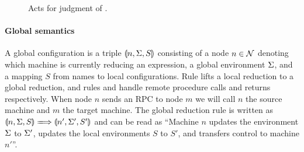 \begin{figure}
    \caption{Acts for judgment of \lang.}
    \label{fig:act-for-judgment}
\end{figure}


\paragraph{Global semantics}
A global configuration is a triple $\llparenthesis n, \Sigma, S \rrparenthesis$ consisting of a node $n \in \mathcal{N}$ denoting which machine is currently reducing an expression, a global environment $\Sigma$, and a mapping $S$ from names to local configurations. Rule  lifts a local reduction to a global reduction, and rules  and  handle remote procedure calls and returns respectively. When node $n$ sends an RPC to node $m$ we will call $n$ the source machine and $m$ the target machine. The global reduction rule is written as $\gconfig{n}{\env}{S} \gstepsto \gconfig{n'}{\env'}{S'}$ and can be read as ``Machine $n$ updates the environment $\Sigma$ to $\Sigma'$, updates the local environments $S$ to $S'$, and transfers control to machine $n'$''.


